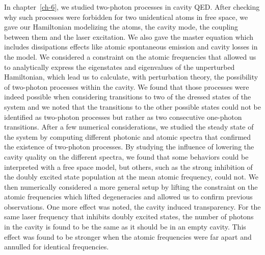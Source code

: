 In chapter~\ref{ch-6}, we studied two-photon processes in cavity QED. After checking why such processes were forbidden for two unidentical atoms in free space, we gave our Hamiltonian modelizing the atoms, the cavity mode, the coupling between them and the laser excitation. We also gave the master equation which includes dissipations effects like atomic spontaneous emission and cavity losses in the model. We considered a constraint on the atomic frequencies that allowed us to analytically express the eigenstates and eigenvalues of the unperturbed Hamiltonian, which lead us to calculate, with perturbation theory, the possibility of two-photon processes within the cavity. We found that those processes were indeed possible when considering transitions to two of the dressed states of the system and we noted that the transitions to the other possible states could not be identified as  two-photon processes but rather as two consecutive one-photon transitions. After a few numerical considerations, we studied the steady state of the system by computing different photonic and atomic spectra that confirmed the existence of two-photon processes. By studying the influence of lowering the cavity quality on the different spectra, we found that some behaviors could be interpreted with a free space model, but others, such as the strong inhibition of the doubly excited state population at the mean atomic frequency, could not. We then numerically considered  a more general setup by lifting the constraint on the atomic frequencies which lifted degeneracies and allowed us to confirm previous observations. One more effect was noted, the cavity induced transparency. For the same laser frequency that inhibits doubly excited states, the number of photons in the cavity is found to be the same as it should be in an empty cavity. This effect was found to be stronger when the atomic frequencies were far apart and annulled for identical frequencies.

